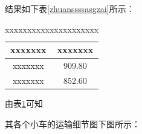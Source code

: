 \documentclass{whutmod}
\begin{document}
			结果如下表\ref{zhuanssssasgzai}所示：
			\begin{table}[H]
			\centering		
			\caption{xxxxxxxxxxxxxxxxxxxxx}\label{biao1}
			\begin{tabular}{cc}
			\toprule[2pt]
				\multicolumn{1}{m{5cm}}{\centering xxxxxxx}
				& \multicolumn{1}{m{5cm}}{\centering xxxxxxx}
				\\
				\midrule[1pt]
				xxxxxxx &   909.80\\ 
				xxxxxxx & 	852.60\\ 
			\bottomrule[2pt]	
			\end{tabular}
			\end{table}
  
  			由表\ref{biao1}可知

			其各个小车的运输细节图下图所示：
			\begin{figure}[H]
				\centering
			\end{figure}	
\end{document}
